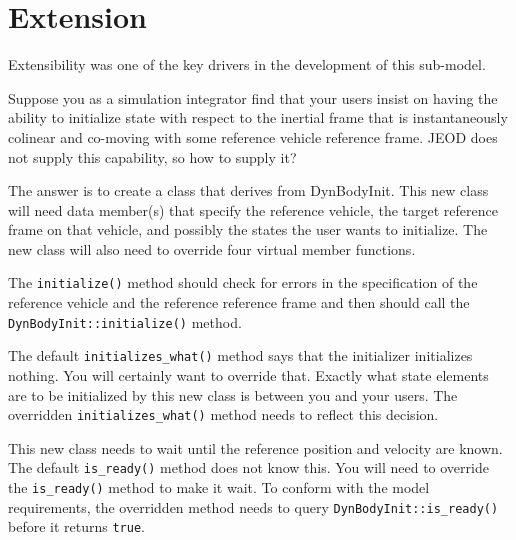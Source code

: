 \section{Extension}
Extensibility was one of the key drivers in the development of this sub-model.

Suppose you as a simulation integrator find that your users insist on
having the ability to initialize state with respect to the inertial frame that
is instantaneously colinear and co-moving with some reference vehicle
reference frame. JEOD does not supply this capability, so how to supply it?

The answer is to create a class that derives from DynBodyInit.
This new class will need data member(s) that
specify the reference vehicle, the target reference frame on that vehicle,
and possibly the states the user wants to initialize.
The new class will also need to override four virtual member functions.

The {\tt initialize()} method should check for errors in the specification
of the reference vehicle and the reference reference frame and then should
call the {\tt DynBodyInit::initialize()} method.

The default {\tt initializes\_what()} method says that the initializer
initializes nothing. You will certainly want to override that. Exactly
what state elements are to be initialized by this new class is between you
and your users. The overridden {\tt initializes\_what()} method needs to
reflect this decision.

This new class needs to wait until the reference position and velocity are
known. The default {\tt is\_ready()} method does not know this.
You will need to override the {\tt is\_ready()} method to make it wait.
To conform with the model requirements, the overridden method needs to
query {\tt DynBodyInit::is\_ready()} before it returns {\tt true}.

